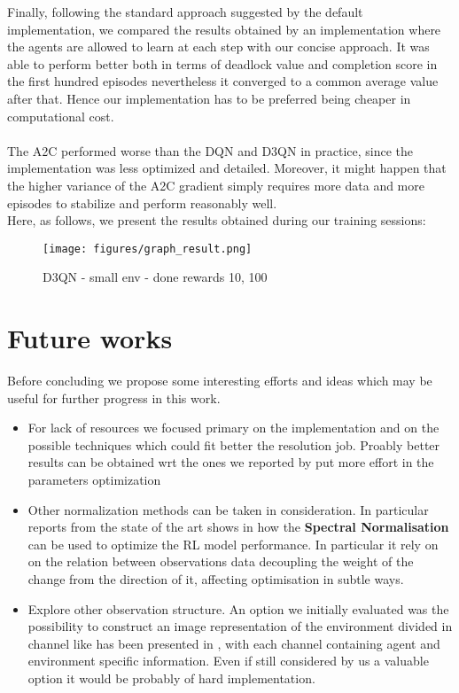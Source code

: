 Finally, following the standard approach suggested by the default implementation, we compared the results obtained by an implementation where the agents are allowed to learn at each step with our concise approach. It was able to perform better both in terms of deadlock value and completion score in the first hundred episodes nevertheless it converged to a common average value after that. Hence our implementation has to be preferred being cheaper in computational cost.\\
\\
The A2C performed worse than the DQN and D3QN in practice, since the implementation was less optimized and detailed. Moreover, it might happen that the higher variance of the A2C gradient simply requires more data and more episodes to stabilize and perform reasonably well.
\\
Here, as follows, we present the results obtained during our training sessions:
\begin{figure}[H]
	\hspace*{-1.5cm} 
	\texttt{[image: figures/graph\_result.png]}
	\centering
	\caption{D3QN - small env - done rewards 10, 100 }
	\label{fig:s5} 
\end{figure}
\section{Future works}
Before concluding we propose some interesting efforts and ideas which may be useful for further progress in this work.
\begin{itemize}
	\item For lack of resources we focused primary on the implementation and on the possible techniques which could fit better the resolution job. Proably better results can be obtained wrt the ones we reported by put more effort in the parameters optimization  
	\item Other normalization methods can be taken in consideration. In particular reports from the state of the art shows in \cite{spectralNorm} how the \textbf{Spectral Normalisation} can be used to optimize the RL model performance. In particular it rely on on the relation between observations data decoupling the weight of the change from the direction of it, affecting optimisation in subtle ways.
	\item Explore other observation structure. An option we initially evaluated was the possibility to construct an image representation of the environment divided in channel like has been presented in \cite{graphObserv},  with each channel containing agent and environment specific information. Even if still considered by us a valuable option it would be probably of hard implementation.
\end{itemize}
